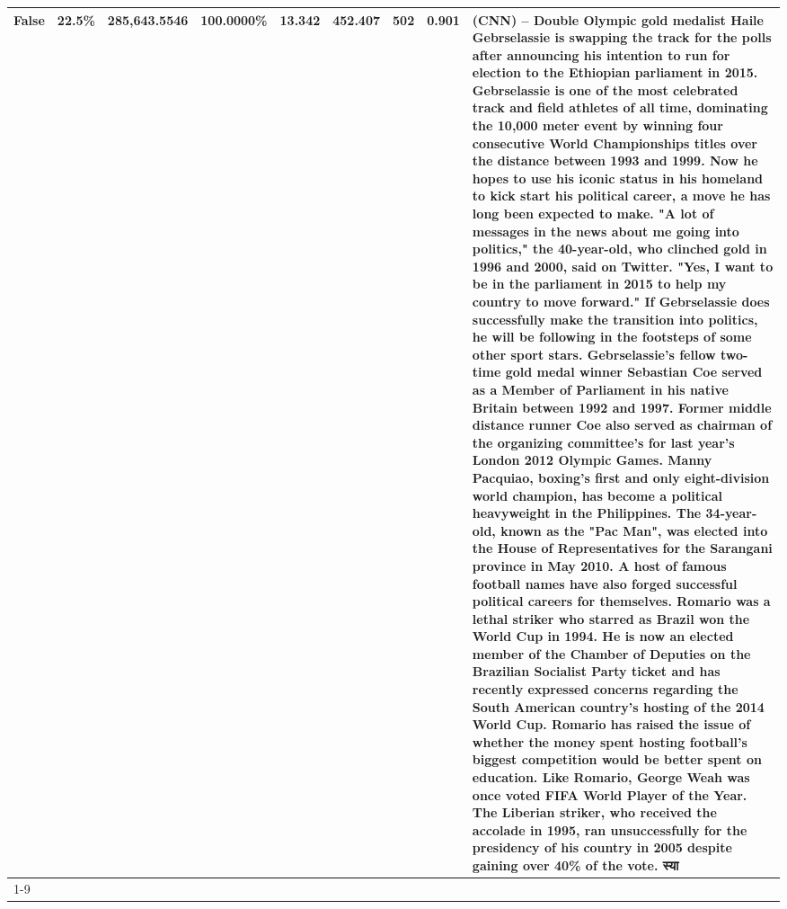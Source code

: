 \begin{table}[H]
{\begin{tabular}{lllrlllll}
False & 22.5\% & 285,643.5546 & \bfseries \color{red} 100.0000\% & 13.342 & 452.407 & 502 & 0.901 & (CNN) -- Double Olympic gold medalist Haile Gebrselassie is swapping the track for the polls after announcing his intention to run for election to the Ethiopian parliament in 2015. Gebrselassie is one of the most celebrated track and field athletes of all time, dominating the 10,000 meter event by winning four consecutive World Championships titles over the distance between 1993 and 1999. Now he hopes to use his iconic status in his homeland to kick start his political career, a move he has long been expected to make. "A lot of messages in the news about me going into politics," the 40-year-old, who clinched gold in 1996 and 2000, said on Twitter. "Yes, I want to be in the parliament in 2015 to help my country to move forward." If Gebrselassie does successfully make the transition into politics, he will be following in the footsteps of some other sport stars. Gebrselassie's fellow two-time gold medal winner Sebastian Coe served as a Member of Parliament in his native Britain between 1992 and 1997. Former middle distance runner Coe also served as chairman of the organizing committee's for last year's London 2012 Olympic Games. Manny Pacquiao, boxing's first and only eight-division world champion, has become a political heavyweight in the Philippines. The 34-year-old, known as the "Pac Man", was elected into the House of Representatives for the Sarangani province in May 2010. A host of famous football names have also forged successful political careers for themselves. Romario was a lethal striker who starred as Brazil won the World Cup in 1994. He is now an elected member of the Chamber of Deputies on the Brazilian Socialist Party ticket and has recently expressed concerns regarding the South American country's hosting of the 2014 World Cup. Romario has raised the issue of whether the money spent hosting football's biggest competition would be better spent on education. Like Romario, George Weah was once voted FIFA World Player of the Year. The Liberian striker, who received the accolade in 1995, ran unsuccessfully for the presidency of his country in 2005 despite gaining over 40\% of the vote. स्या \\
\cline{1-9}

\end{tabular}}
\end{table}

